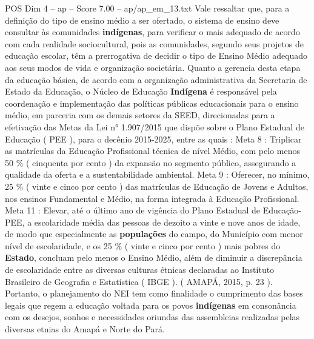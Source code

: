\begin{textsample}{POS Dim 4 – ap – Score 7.00 – ap/ap\_em\_13.txt}
Vale ressaltar que, para a definição do tipo de ensino médio a ser ofertado, o sistema de ensino deve consultar às comunidades \textbf{indígenas}, para verificar o mais adequado de acordo com cada realidade sociocultural, pois as comunidades, segundo seus projetos de educação escolar, têm a prerrogativa de decidir o tipo de Ensino Médio adequado aos seus modos de vida e organização societária.
Quanto a gerencia desta etapa da educação básica, de acordo com a organização administrativa da Secretaria de Estado da Educação, o Núcleo de Educação \textbf{Indígena} é responsável pela coordenação e implementação das políticas públicas educacionais para o ensino médio, em parceria com os demais setores da SEED, direcionadas para a efetivação das Metas da Lei n{\EmojiFont °} 1.907/2015 que dispõe sobre o Plano Estadual de Educação ( PEE ), para o decênio 2015-2025, entre as quais : Meta 8 : Triplicar as matrículas da Educação Profissional técnica de nível Médio, com pelo menos 50 \% ( cinquenta por cento ) da expansão no segmento público, assegurando a qualidade da oferta e a sustentabilidade ambiental.
Meta 9 : Oferecer, no mínimo, 25 \% ( vinte e cinco por cento ) das matrículas de Educação de Jovens e Adultos, nos ensinos Fundamental e Médio, na forma integrada à Educação Profissional.
Meta 11 : Elevar, até o último ano de vigência do Plano Estadual de Educação-PEE, a escolaridade média das pessoas de dezoito a vinte e nove anos de idade, de modo que especialmente as \textbf{populações} do campo, do Município com menor nível de escolaridade, e os 25 \% ( vinte e cinco por cento ) mais pobres do \textbf{Estado}, concluam pelo menos o Ensino Médio, além de diminuir a discrepância de escolaridade entre as diversas culturas étnicas declaradas ao Instituto Brasileiro de Geografia e Estatística ( IBGE ). ( AMAPÁ, 2015, p. 23 ).
Portanto, o planejamento do NEI tem como finalidade o cumprimento das bases legais que regem a educação voltada para os povos \textbf{indígenas} em consonância com os desejos, sonhos e necessidades oriundas das assembleias realizadas pelas diversas etnias do Amapá e Norte do Pará.

\end{textsample}
